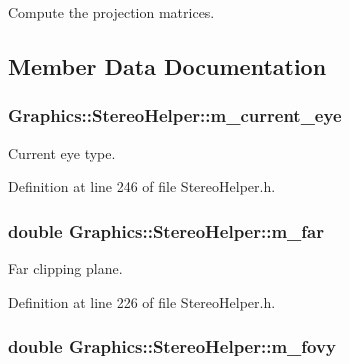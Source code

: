 Compute the projection matrices. 



\subsection{Member Data Documentation}
\hypertarget{class_graphics_1_1_stereo_helper_aa32df0fd8c66f7fb8e3922f6413bb421}{
\subsubsection[{m\_\-current\_\-eye}]{ {\bf Graphics::StereoHelper::m\_\-current\_\-eye}}}
\label{class_graphics_1_1_stereo_helper_aa32df0fd8c66f7fb8e3922f6413bb421}


Current eye type. 



Definition at line 246 of file StereoHelper.h.

\hypertarget{class_graphics_1_1_stereo_helper_adaf953e95e951648a78c1be3af5a7245}{
\subsubsection[{m\_\-far}]{\setlength{\rightskip}{0pt plus 5cm}double {\bf Graphics::StereoHelper::m\_\-far}}}
\label{class_graphics_1_1_stereo_helper_adaf953e95e951648a78c1be3af5a7245}


Far clipping plane. 



Definition at line 226 of file StereoHelper.h.

\hypertarget{class_graphics_1_1_stereo_helper_a21f4b593c9629fe91c8f4aa3fdc3fde7}{
\subsubsection[{m\_\-fovy}]{\setlength{\rightskip}{0pt plus 5cm}double {\bf Graphics::StereoHelper::m\_\-fovy}}}
\label{class_graphics_1_1_stereo_helper_a21f4b593c9629fe91c8f4aa3fdc3fde7}



